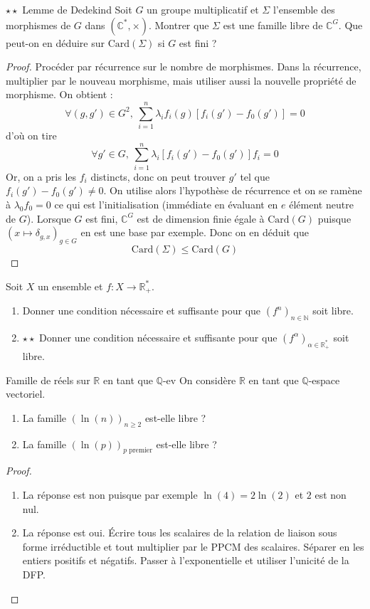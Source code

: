 \documentclass[french,a4paper]{article}
\newcommand{\N}{\mathbb{N}}
\newcommand{\Q}{\mathbb{Q}}
\newcommand{\R}{\mathbb{R}}
\newcommand{\C}{\mathbb{C}}
\newcommand{\st}{^*}
\theoremstyle{plain}
\theoremstyle{definition}
\theoremstyle{remark}
\begin{document}
\begin{ex}[Moulin.15]{$\star\star$ Lemme de Dedekind}
	Soit $G$ un groupe multiplicatif et $\Sigma$ l'ensemble des morphismes de $G$ dans $(\C\st,\times)$. Montrer que $\Sigma$ est une famille libre de $\C^G$. Que peut-on en déduire sur $\text{Card}(\Sigma)$ si $G$ est fini ?
\end{ex}
\begin{proof}
	Procéder par récurrence sur le nombre de morphismes. Dans la récurrence, multiplier par le nouveau morphisme, mais utiliser aussi la nouvelle propriété de morphisme. On obtient : $$\forall(g,g')\in G^2,\ \sum_{i=1}^{n}\lambda_if_i(g)\left[f_i(g')-f_0(g')\right]=0$$ d'où on tire $$\forall g'\in G,\ \sum_{i=1}^{n}\lambda_i\left[f_i(g')-f_0(g')\right]f_i=0$$ Or, on a pris les $f_i$ distincts, donc on peut trouver $g'$ tel que $f_i(g')-f_0(g')\ne 0$. On utilise alors l'hypothèse de récurrence et on se ramène à $\lambda_0 f_0=0$ ce qui est l'initialisation (immédiate en évaluant en $e$ élément neutre de $G$). Lorsque $G$ est fini, $\C^G$ est de dimension finie égale à $\text{Card}(G)$ puisque $(x\mapsto \delta_{g,x})_{g\in G}$ en est une base par exemple. Donc on en déduit que $$\text{Card}(\Sigma)\leqslant\text{Card}(G)$$
\end{proof}

\begin{ex}[Moulin.16]{}
	Soit $X$ un ensemble et $f:X\to\R_+\st$.
	\begin{enumerate}
		\item Donner une condition nécessaire et suffisante pour que $(f^n)_{n\in\N}$ soit libre.
		\item $\star\star$ Donner une condition nécessaire et suffisante pour que $(f^\alpha)_{\alpha\in\R_+\st}$ soit libre.
	\end{enumerate}
\end{ex}

\begin{ex}[Moulin.17]{Famille de réels sur $\R$ en tant que $\Q$-ev}
	On considère $\R$ en tant que $\Q$-espace vectoriel.
	\begin{enumerate}
		\item La famille $(\ln(n))_{n\geqslant 2}$ est-elle libre ?
		\item La famille $(\ln(p))_{p\text{ premier}}$ est-elle libre ?
	\end{enumerate}
\end{ex}
\begin{proof}
	\begin{enumerate}
		\item La réponse est non puisque par exemple $\ln(4)=2\ln(2)$ et $2$ est non nul.
		\item La réponse est oui. Écrire tous les scalaires de la relation de liaison sous forme irréductible et tout multiplier par le PPCM des scalaires. Séparer en les entiers positifs et négatifs. Passer à l'exponentielle et utiliser l'unicité de la DFP.
	\end{enumerate}
\end{proof}
\end{document}
